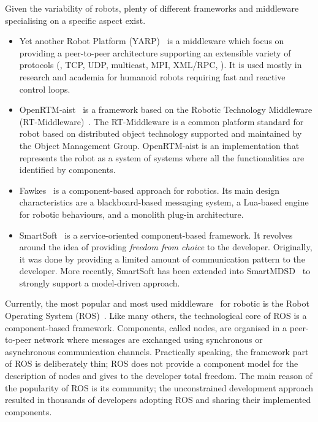 Given the variability of robots, plenty of different frameworks and middleware specialising on a specific aspect exist. 
\begin{itemize}
\item Yet another Robot Platform (YARP)~\cite{metta2006yarp} is a middleware which focus on providing a peer-to-peer architecture supporting an extensible variety of protocols (\eg, TCP, UDP, multicast, MPI, XML/RPC, \etc). It is used mostly in research and academia for humanoid robots requiring fast and reactive control loops. 
\item OpenRTM-aist~\cite{ando2008software} is a framework based on the Robotic Technology Middleware (RT-Middleware)~\cite{ando2005rt}. The RT-Middleware is a common platform standard for robot based on distributed object technology supported and maintained by the Object Management Group. OpenRTM-aist is an implementation that represents the robot as a system of systems where all the functionalities are identified by components.
\item Fawkes~\cite{niemueller2010design} is a component-based approach for robotics. Its main design characteristics are a blackboard-based messaging system, a Lua-based engine for robotic behaviours, and a monolith plug-in architecture.
\item SmartSoft~\cite{schlegel1999software} is a service-oriented component-based framework. It revolves around the idea of providing \textit{freedom from choice} to the developer. Originally, it was done by providing a limited amount of communication pattern to the developer. More recently, SmartSoft has been extended into SmartMDSD~\cite{dennis2016smartmdsd} to strongly support a model-driven approach.
\end{itemize}

Currently, the most popular and most used middleware~\cite{elkady2012robotics} for robotic is the Robot Operating System (ROS)~\cite{quigley2009ros}. Like many others, the technological core of ROS is a component-based framework. Components, called nodes, are organised in a peer-to-peer network where messages are exchanged using synchronous or asynchronous communication channels. Practically speaking, the framework part of ROS is deliberately thin; ROS does not provide a component model for the description of nodes and gives to the developer total freedom. The main reason of the popularity of ROS is its community; the unconstrained development approach resulted in thousands of developers adopting ROS and sharing their implemented components.

